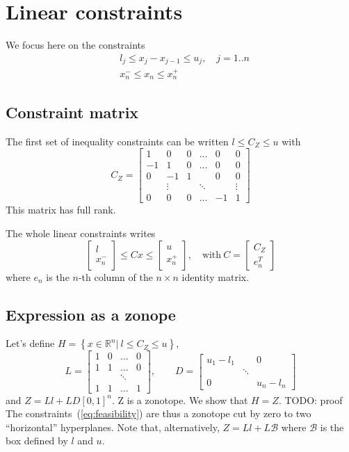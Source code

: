\documentclass[]{article}
\newcommand{\BIN}{\begin{bmatrix}}
\newcommand{\BOUT}{\end{bmatrix}}
\begin{document}
\section{Linear constraints}
We focus here on the constraints
\begin{align*}
 & l_j \leq x_j - x_{j-1} \leq u_j, \quad j=1..n \label{eq:inequality}\\
 & x_n^- \leq x_n \leq x_n^+
\end{align*}

\subsection{Constraint matrix}
The first set of inequality constraints can be written $l \leq C_Z \leq u$ with
\begin{equation}
  C_Z = \BIN  1 &  0 & 0 & \ldots &  0 & 0\\
             -1 &  1 & 0 & \ldots &  0 & 0\\
              0 & -1 & 1 &        &  0 & 0\\
                & \vdots &&\ddots &    & \vdots \\
              0 &  0 & 0 & \ldots & -1 & 1\BOUT 
\end{equation}
This matrix has full rank.

The whole linear constraints writes
\begin{equation}
  \BIN l \\ x_n^- \BOUT \leq C x \leq \BIN u \\ x_n^+ \BOUT, \quad \mbox{with}\ C = \BIN C_Z \\ e_n^T\BOUT
  \label{eq:feasibility}
\end{equation}
where $e_n$ is the $n$-th column of the $n\times n$ identity matrix.

\subsection{Expression as a zonope}
Let's define $H = \left\{x \in \mathbb{R}^n \vert\ l \leq C_Z \leq u\right\}$, 
\begin{equation}
L = \BIN 1 & 0 & \ldots & 0 \\ 1 & 1 &\ldots & 0 \\ & & \ddots & \\ 1 & 1 &\ldots & 1\BOUT, \qquad D = \BIN u_1 - l_1 & & 0 \\ & \ddots & \\ 0 & & u_n - l_n\BOUT
\end{equation}
and $Z = Ll + LD \left[0,1\right]^n$. Z is a zonotope. We show that $H = Z$.\newline
TODO: proof
\newline
The constraints~(\ref{eq:feasibility}) are thus a zonotope cut by zero to two ``horizontal'' hyperplanes.
Note that, alternatively, $Z = Ll + L \mathcal{B}$ where $\mathcal{B}$ is the box defined by $l$ and $u$.
\end{document}
